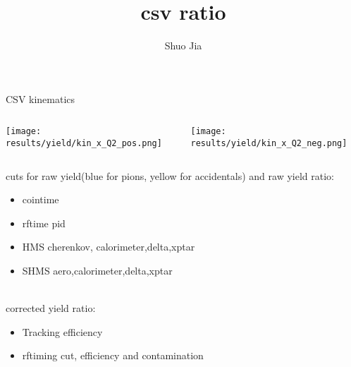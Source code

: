\documentclass[aspectratio=169,xcolor=dvipsnames]{beamer}
\title{csv ratio}
\date{}
\author{Shuo Jia}
\begin{document}
\maketitle


\begin{frame}{CSV kinematics}
\begin{columns}
\begin{column}[T]{0.5\textwidth}
\texttt{[image: results/yield/kin\_x\_Q2\_pos.png]}
\end{column}
\begin{column}[T]{0.5\textwidth}
\texttt{[image: results/yield/kin\_x\_Q2\_neg.png]}
\end{column}
\end{columns}
\end{frame}
\begin{frame}{}
cuts for raw yield(blue for pions, yellow for accidentals) and raw yield ratio: 
    \begin{itemize}
        \item cointime
        \item rftime pid
        \item HMS cherenkov, calorimeter,delta,xptar
        \item SHMS aero,calorimeter,delta,xptar
    \end{itemize}
\\
corrected yield ratio:
\begin{itemize}
    \item Tracking efficiency
    \item rftiming cut, efficiency and contamination
\end{itemize}
\end{frame}

\end{document}
